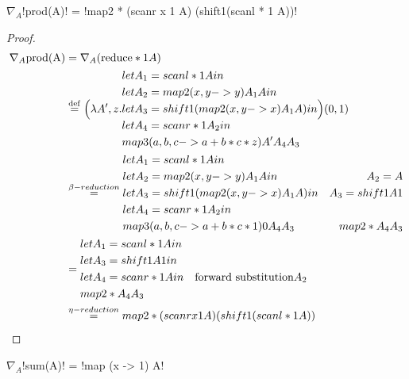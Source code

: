  \begin{lemma}
     $\nabla_A$!prod(A)! = !map2 * (scanr x 1 A) (shift1(scanl * 1 A))!
 \end{lemma}

 \begin{proof}
\begin{align*}
    \nabla_A \text{prod(A)} 
    &= \nabla_A(\text{reduce} * 1 A) \\
    &\stackrel {\mathrm{def}}=  \Big(\lambda A',z.
    \begin{aligned}
        & let A_1 = scanl * 1 A in \\
        & let A_2 = map2 (x,y -> y) A_1 A in\\
        & let A_3 = shift1 (map2 (x,y -> x) A_1 A) in\\
        & let A_4 = scanr * 1 A_2 in \\
        & map3 (a,b,c -> a+b*c*z) A' A_4 A_3
    \end{aligned}
    \Big)(0,1)\\
    &\stackrel{\beta-reduction}{=}  \begin{aligned}
        & let A_1 = scanl * 1 A in &\\
        & let A_2 = map2 (x,y -> y) A_1 A in & A_2=  A\\
        & let A_3 = shift1 (map2 (x,y -> x) A_1 A) in & A_3 = shift1 A1\\
        & let A_4 = scanr * 1 A_2 in & \\
        & map3 (a,b,c -> a+b*c*1) 0 A_4 A_3 & map2 * A_4 A_3
    \end{aligned}\\
    &=  \begin{aligned}
        & let A_1 = scanl * 1 A in & \\
        & let A_3 = shift1 A1 in &\\
        & let A_4 = scanr * 1 A in &\text{forward substitution} A_2\\
        & map2 * A_4 A_3
    \end{aligned}\\
    &\stackrel{\eta-reduction}{=} map2 * (scanr x 1 A) (shift1(scanl * 1 A))
\end{align*}
 \end{proof}

 \begin{lemma}
     $\nabla_A$!sum(A)! = !map (x -> 1) A!
 \end{lemma}

